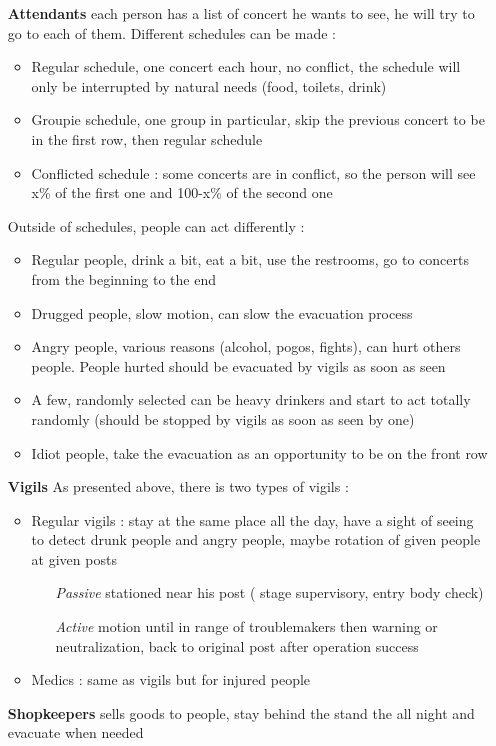 \begin{itemize}
	\item[{\bf Attendants}] each person has a list of concert he wants to see,
	he will try to go to each of them. Different schedules can be made :\\
	
		\begin{itemize}
			\item Regular schedule, one concert each hour, no conflict, the
			schedule will only be interrupted by natural needs (food, toilets,
			drink)
			\item Groupie schedule, one group in particular, skip the previous
			concert to be in the first row, then regular schedule
			\item Conflicted schedule : some concerts are in conflict, so the
			person will see x\% of the first one and 100-x\% of the second one
		\end{itemize}


 	Outside of schedules, people can act differently :\\
		
		\begin{itemize}
			\item Regular people, drink a bit, eat a bit, use the restrooms, go
			to concerts from the beginning to the end
			\item Drugged people, slow motion, can slow the evacuation process
			\item Angry people, various reasons (alcohol, pogos, fights), can
			hurt others people. People hurted should be evacuated by vigils as
			soon as seen
			\item A few, randomly selected can be heavy drinkers and start to
			act totally randomly (should be stopped by vigils as soon as seen by
			one)
			\item Idiot people, take the evacuation as an opportunity to be on
			the front row
		\end{itemize}

	\item[{\bf Vigils}] As presented above, there is two types of vigils :
		\begin{itemize}
			\item Regular vigils : stay at the same place all the day, have
			a sight of seeing to detect drunk people and angry people, maybe
			rotation of given people at given posts
			\begin{itemize}
				\item[\emph{Passive}] stationed near his post ( stage
				supervisory, entry body check)
				\item[\emph{Active}] motion until in range of troublemakers
				then warning or neutralization, back to original post after
				operation success
			\end{itemize}
			\item Medics : same as vigils but for injured people
		\end{itemize}

	\item[{\bf Shopkeepers}] sells goods to people, stay behind the stand the
	all night and evacuate when needed
\end{itemize}

